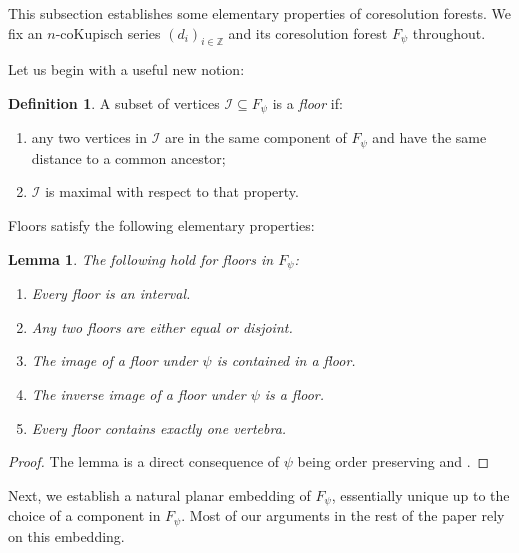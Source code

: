 \documentclass[a4paper]{amsart}
\newtheorem{lemma}[theorem]{Lemma}
\theoremstyle{definition}
\newtheorem{definition}[theorem]{Definition}
\theoremstyle{remark}
\numberwithin{equation}{theorem}
\newcommand{\Dfn}[1]{\emph{\color{blue}#1}} %
\newcommand{\Z}{\mathbb{Z}}
\newcommand{\psiforest}{F_\psi}
\begin{document}
This subsection establishes some elementary properties of coresolution forests.
We fix an $ n $-coKupisch series $(d_i)_{i\in\Z}$ and its coresolution forest $ \psiforest $ throughout.

Let us begin with a useful new notion:

\begin{definition}
  A subset of vertices $\mathcal{I}\subseteq\psiforest$ is a \Dfn{floor} if:
  \begin{enumerate}[\rm(i)]
  \item any two vertices in $ \mathcal I $ are in the same component of $\psiforest$ and have the same distance to a common ancestor;
  \item $ \mathcal I $ is maximal with respect to that property.
  \end{enumerate}
\end{definition}

Floors satisfy the following elementary properties:

\begin{lemma}\label{prop:floors}
    The following hold for floors in $ \psiforest $:
        \begin{enumerate}
            \item Every floor is an interval.
            \item Any two floors are either equal or disjoint.
            \item The image of a floor under $ \psi $ is contained in a floor.
            \item The inverse image of a floor under $ \psi $ is a floor.
            \item\label{unique.vertebra} Every floor contains exactly one vertebra.
        \end{enumerate}
\end{lemma}

\begin{proof}
    The lemma is a direct consequence of $\psi$ being order preserving and .
\end{proof}

Next, we establish a natural planar embedding of $\psiforest$, essentially unique up to the choice of a component in $\psiforest$. Most of our arguments in the rest of the paper rely on this embedding.
\end{document}
